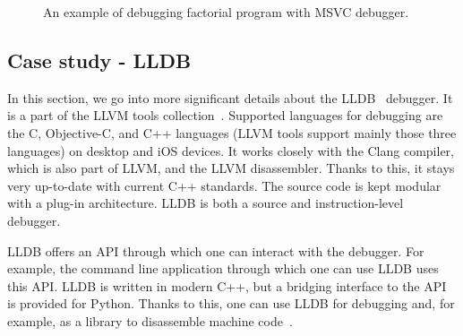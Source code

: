 \begin{figure}
    \caption{An example of debugging factorial program with MSVC debugger.}
    \label{fig:msvc}
\end{figure}

\subsection{Case study - LLDB}\label{section:case-study}
In this section, we go into more significant details about the LLDB~\cite{lldb}
debugger. It is a part of the LLVM tools collection~\cite{llvm}. Supported
languages for debugging are the C, Objective-C, and C++ languages (LLVM tools
support mainly those three languages) on desktop and iOS devices. It works
closely with the Clang compiler, which is also part of LLVM, and the LLVM
disassembler. Thanks to this, it stays very up-to-date with current C++
standards. The source code is kept modular with a plug-in architecture. LLDB is
both a source and instruction-level debugger.

LLDB offers an API through which one can interact with the debugger. For
example, the command line application through which one can use LLDB uses this
API. LLDB is written in modern C++, but a bridging interface to the API is
provided for Python. Thanks to this, one can use LLDB for debugging and, for
example, as a library to disassemble machine code~\cite{lldb}.

